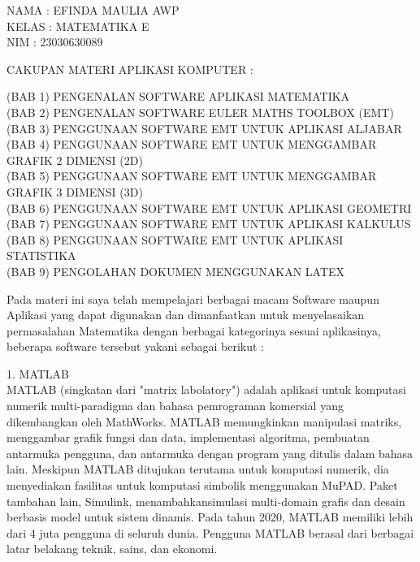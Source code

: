 \documentclass[a4paper,10pt]{article}
\begin{document}
\begin{eulernotebook}
\eulersubheading{}
\begin{eulercomment}
NAMA  : EFINDA MAULIA AWP\\
KELAS : MATEMATIKA E\\
NIM   : 23030630089

\end{eulercomment}
\eulersubheading{}
\begin{eulercomment}
CAKUPAN MATERI APLIKASI KOMPUTER :

(BAB 1) PENGENALAN SOFTWARE APLIKASI MATEMATIKA\\
(BAB 2) PENGENALAN SOFTWARE EULER MATHS TOOLBOX (EMT)\\
(BAB 3) PENGGUNAAN SOFTWARE EMT UNTUK APLIKASI ALJABAR\\
(BAB 4) PENGGUNAAN SOFTWARE EMT UNTUK MENGGAMBAR GRAFIK 2 DIMENSI (2D)\\
(BAB 5) PENGGUNAAN SOFTWARE EMT UNTUK MENGGAMBAR GRAFIK 3 DIMENSI (3D)\\
(BAB 6) PENGGUNAAN SOFTWARE EMT UNTUK APLIKASI GEOMETRI\\
(BAB 7) PENGGUNAAN SOFTWARE EMT UNTUK APLIKASI KALKULUS\\
(BAB 8) PENGGUNAAN SOFTWARE EMT UNTUK APLIKASI STATISTIKA\\
(BAB 9) PENGOLAHAN DOKUMEN MENGGUNAKAN LATEX

\end{eulercomment}
\eulersubheading{}
\begin{eulercomment}
Pada materi ini saya telah mempelajari berbagai macam Software maupun
Aplikasi yang dapat digunakan dan dimanfaatkan untuk menyelasaikan
permasalahan Matematika dengan berbagai kategorinya sesuai
aplikasinya, beberapa software tersebut yakani sebagai berikut :

1. MATLAB\\
MATLAB (singkatan dari "matrix labolatory") adalah aplikasi untuk
komputasi numerik multi-paradigma dan bahasa pemrograman komersial
yang dikembangkan oleh MathWorks. MATLAB memungkinkan manipulasi
matriks, menggambar grafik fungsi dan data, implementasi algoritma,
pembuatan antarmuka pengguna, dan antarmuka dengan program yang
ditulis dalam bahasa lain. Meskipun MATLAB ditujukan terutama untuk
komputasi numerik, dia menyediakan fasilitas untuk komputasi simbolik
menggunakan MuPAD. Paket tambahan lain, Simulink, menambahkansimulasi
multi-domain grafis dan desain berbasis model untuk sistem dinamis.
Pada tahun 2020, MATLAB memiliki lebih dari 4 juta pengguna di seluruh
dunia. Pengguna MATLAB berasal dari berbagai latar belakang teknik,
sains, dan ekonomi.


\end{eulercomment}
\end{eulernotebook}
\end{document}
